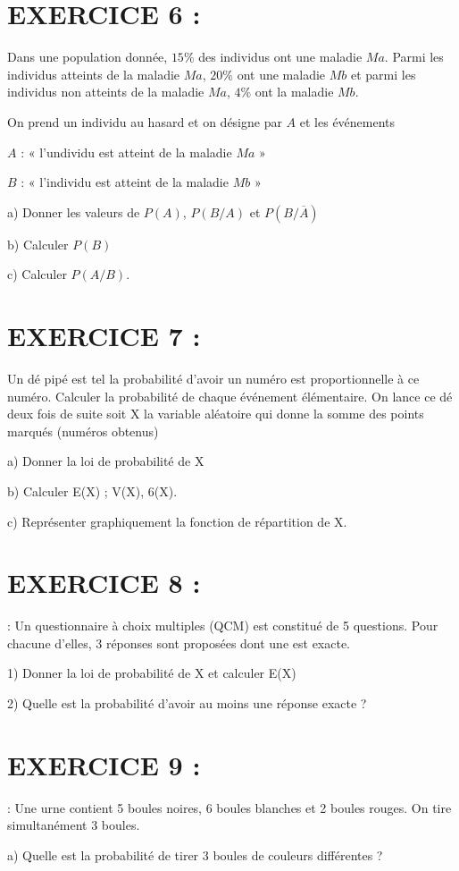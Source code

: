 \documentclass[12pt]{article}
\begin{document}
\section*{EXERCICE 6 :} 
Dans une population donnée, $15\%$ des individus ont une maladie $Ma$. Parmi les individus atteints  de la maladie $Ma$, $20\%$ ont une maladie $Mb$ et parmi les individus non atteints de la maladie $Ma$, $4\%$   ont la maladie $Mb.$

On prend un individu au hasard et on désigne par $A$ et les événements

$A$ : « l’undividu est atteint de la maladie $Ma$ »

$B$ : « l’individu est atteint de la maladie $Mb$ »

a) Donner les valeurs de $P(A)$, $P(B/A)$ et $P(B/\overline{A})$ 

b) Calculer $P(B)$

c) Calculer $P(A/B)$.
\section*{EXERCICE 7 :}
Un dé pipé est tel la probabilité d’avoir un numéro est proportionnelle à ce numéro.
Calculer la probabilité  de chaque événement élémentaire.
On lance ce dé deux fois de suite  soit X la variable aléatoire qui donne la somme des points marqués (numéros obtenus) 

a) Donner la loi de probabilité de X

b) Calculer E(X) ; V(X), 6(X).

c) Représenter graphiquement la fonction de répartition de X.
\section*{EXERCICE 8 :} : Un questionnaire à choix multiples (QCM) est constitué de 5 questions. Pour chacune d’elles, 3 réponses sont proposées dont une est exacte.

1) Donner la loi de probabilité de X et calculer E(X)

2) Quelle est la probabilité d’avoir au moins une réponse exacte ? 
\section*{EXERCICE 9 :} : Une urne contient 5 boules noires, 6 boules blanches et 2 boules rouges. On tire simultanément 3 boules.

a) Quelle est la probabilité de tirer 3 boules de couleurs différentes ?      
     
\end{document}
